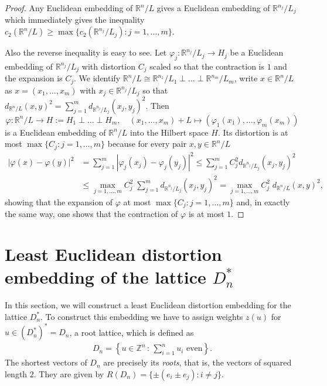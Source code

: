 \documentclass{amsart}
\newcommand{\R}{\mathbb{R}}
\newcommand{\Z}{\mathbb{Z}}
\begin{document}
\begin{proof}
  Any Euclidean embedding of $\R^n/L$ gives a Euclidean embedding of
  $\R^{n_j}/L_j$ which immediately gives the inequality
  $c_2(\R^n/L) \geq \max \{ c_2(\R^{n_j}/L_j) : j = 1, \ldots, m\}$.

  Also the reverse inequality is easy to see. Let
  $ \varphi_j : \R^{n_j} / L_j \to H_j$ be a Euclidean embedding of
  $ \R^{n_j}/L_j $ with distortion $C_j$ scaled so that the
  contraction is $1$ and the expansion is $C_j$. We identify
  $ \R^n /L \cong \R^{n_1} /L_1\perp \ldots \perp \R^{n_m}/L_m $,
  write $ x \in \R^n/L $ as $x = (x_1,\ldots,x_m) $ with
  $x_j \in \R^{n_j}/L_j $ so that
  $d_{\R^n/L}(x,y)^2 = \sum_{j = 1}^m d_{\R^{n_j} /L_j}(x_j,y_j)^2
  $. Then
\[
\varphi: \R^n /L \to H:= H_1 \perp \ldots \perp H_m,  \quad   (x_1,\ldots,x_m) + L  \mapsto (\varphi_1(x_1), \ldots, \varphi_m(x_m))
\]
is a Euclidean embedding of $\R^n/L $ into the Hilbert space $H
$. Its distortion is at most $\max\{C_j : j = 1, \ldots, m\}$ because
for every pair $x, y \in \R^n / L$
\[
\begin{split}
  |\varphi(x)- \varphi(y)|^2 & = \sum_{j = 1}^m |\varphi_j(x_j)- \varphi_j(y_j)|^2 \leq \sum_{j = 1}^m C_j^2 d_{\R^{n_j}/L_j}(x_j,y_j)^2   \\
  & \leq \max_{j=1, \ldots, m} C_j^2 \; \sum_{j = 1}^m
  d_{\R^{n_j}/L_j}(x_j,y_j)^2 = \max_{j=1, \ldots, m} C_j^2 \;
  d_{\R^n/L}(x,y)^2,
\end{split}
\]
showing that the expansion of $\varphi$ at most
$\max\{C_j : j = 1, \ldots, m\}$ and, in exactly the same way, one
shows that the contraction of $\varphi$ is at most $1$.
\end{proof}

%
%
%

\section{Least Euclidean distortion embedding of the lattice $ D_n^*
  $}
\label{sec:dnstar}

In this section, we will construct a least Euclidean distortion
embedding for the lattice $ D_n^* $. To construct this embedding we
have to assign weights $z(u)$ for $u \in (D_n^*)^* = D_n $, a root
lattice,  which is
defined as
\begin{align*}
	D_n = \left\{ u \in \Z^n \, : \, \sum_{i = 1}^n u_i \text{ even}  \right\}.
\end{align*}
The shortest vectors of $ D_n $ are precisely its \emph{roots}, that is,
the vectors of squared length $ 2 $. They are given by
$ R(D_n) = \{\pm (e_i \pm e_j) :  i \neq j \}$.
\end{document}

